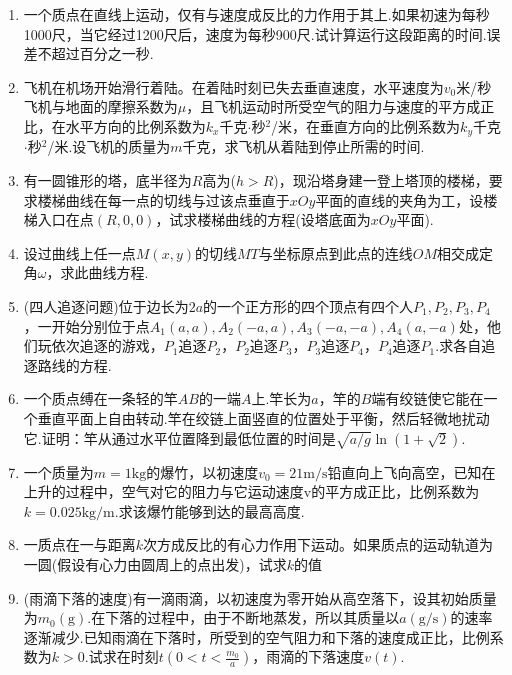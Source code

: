 \begin{enumerate}
	\item 一个质点在直线上运动，仅有与速度成反比的力作用于其上.如果初速为每秒1000尺，当它经过1200尺后，速度为每秒900尺.试计算运行这段距离的时间.误差不超过百分之一秒.
	
	\item 飞机在机场开始滑行着陆。在着陆时刻已失去垂直速度，水平速度为$v_{0}$米/秒飞机与地面的摩擦系数为$\mu$，且飞机运动时所受空气的阻力与速度的平方成正比，在水平方向的比例系数为$k_{x}$千克$\cdot$秒$^{2}$/米，在垂直方向的比例系数为$k_{y}$千克$\cdot$秒$^{2}$/米.设飞机的质量为$m$千克，求飞机从着陆到停止所需的时间.
	\item 有一圆锥形的塔，底半径为$R$高为($h>R$)，现沿塔身建一登上塔顶的楼梯，要求楼梯曲线在每一点的切线与过该点垂直于$xOy$平面的直线的夹角为工，设楼梯入口在点$(R, 0,0)$，试求楼梯曲线的方程(设塔底面为$xOy$平面).
	
	\item 设过曲线上任一点$M(x,y)$的切线$MT$与坐标原点到此点的连线$OM$相交成定角$\omega$，求此曲线方程.
	
	\item (四人追逐问题)位于边长为$2a$的一个正方形的四个顶点有四个人$P_{1}, P_{2}, P_{3}, P_{4}$，一开始分别位于点$A_{1}(a, a), A_{2}(-a, a), A_{3}(-a,-a), A_{4}(a,-a)$处，他们玩依次追逐的游戏，$P_{1}$追逐$P_{2}$，$P_{2}$追逐$P_{3}$，$P_{3}$追逐$P_{4}$，$P_{4}$追逐$P_{1}$.求各自追逐路线的方程.
	
	\item 一个质点缚在一条轻的竿$AB$的一端$A$上.竿长为$a$，竿的$B$端有绞链使它能在一个垂直平面上自由转动.竿在绞链上面竖直的位置处于平衡，然后轻微地扰动它.证明：竿从通过水平位置降到最低位置的时间是$\sqrt{a / g} \ln (1+\sqrt{2})$.
	
	\item 一个质量为$m=1 \mathrm{kg}$的爆竹，以初速度$v_{0}=21 \mathrm{m} / \mathrm{s}$铅直向上飞向高空，已知在上升的过程中，空气对它的阻力与它运动速度v的平方成正比，比例系数为$k=0.025 \mathrm{kg} / \mathrm{m}$.求该爆竹能够到达的最高高度.
	
	\item 一质点在一与距离$k$次方成反比的有心力作用下运动。如果质点的运动轨道为一圆(假设有心力由圆周上的点出发)，试求$k$的值
	
	\item (雨滴下落的速度)有一滴雨滴，以初速度为零开始从高空落下，设其初始质量为$m_{0}(\mathrm{g})$.在下落的过程中，由于不断地蒸发，所以其质量以$a(\mathrm{g} / \mathrm{s})$的速率逐渐减少.已知雨滴在下落时，所受到的空气阻力和下落的速度成正比，比例系数为$k>0$.试求在时刻$t\left(0<t<\frac{m_{0}}{a}\right)$，雨滴的下落速度$v(t)$.
\end{enumerate}